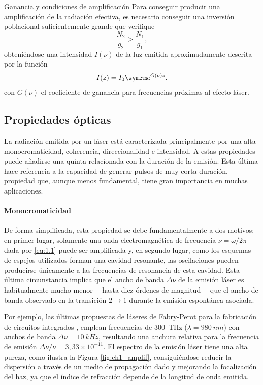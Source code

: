 \begin{footheorem*}{Ganancia y condiciones de amplificación}
    Para conseguir producir una amplificación de la radiación efectiva, es necesario conseguir una inversión poblacional suficientemente grande que verifique
    \begin{equation}
      \frac{N_{2}}{g_{2}} > \frac{N_{1}}{g_{1}},
    \end{equation}
    obteniéndose una intensidad $I(\nu)$ de la luz emitida aproximadamente descrita por la función
    \begin{equation}
      I(z) = I_{0}\eu^{G(\nu)z},
    \end{equation}
    con $G(\nu)$ el coeficiente de ganancia para frecuencias próximas al efecto láser.
\end{footheorem*}

\subsection{Propiedades ópticas}\label{sec:1.1.2}
La radiación emitida por un láser está caracterizada principalmente por una alta monocromaticidad, coherencia, direccionalidad e intensidad. A estas propiedades puede añadirse una quinta relacionada con la duración de la emisión\autocite{Svelto2010}. Esta última hace referencia a la capacidad de generar pulsos de muy corta duración, propiedad que, aunque menos fundamental, tiene gran importancia en muchas aplicaciones. 

\paragraph{Monocromaticidad}\label{par:1.1.2.1}
De forma simplificada, esta propiedad se debe fundamentalmente a dos motivos: en primer lugar, solamente una onda electromagnética de frecuencia $\nu=\omega/2 \pi$ dada por \eqref{eq:1.1} puede ser amplificada y, en segundo lugar, como los esquemas de espejos utilizados forman una cavidad resonante, las oscilaciones pueden producirse únicamente a las frecuencias de resonancia de esta cavidad. Esta última circunstancia implica que el ancho de banda $\Delta\nu$ de la emisión láser es habitualmente mucho menor ---hasta diez órdenes de magnitud--- que el ancho de banda observado en la transición $2\rightarrow 1$ durante la emisión espontánea asociada.

Por ejemplo, las últimas propuestas de láseres de Fabry-Perot para la fabricación de circuitos integrados \autocite{Tran2022}, emplean frecuencias de \qty{300}{THz} ($\lambda = \qty{980}{nm}$) con anchos de banda $\Delta\nu = \qty{10}{kHz}$, resultando una anchura relativa para la frecuencia de emisión $\Delta\nu/\nu = 3,33\times 10^{-11}$. El espectro de la emisión láser tiene una alta pureza, como ilustra la Figura \ref{fig:ch1_amplif}, consiguiéndose reducir la dispersión a través de un medio de propagación dado y mejorando la focalización del haz, ya que el índice de refracción depende de la longitud de onda emitida.


